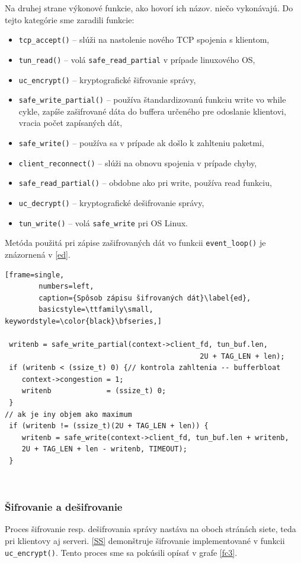  Na druhej strane výkonové funkcie, ako hovorí ich názov. niečo vykonávajú. Do tejto kategórie sme zaradili funkcie:
 \begin{itemize}
 	\item\lstinline|tcp_accept()| -- slúži na nastolenie nového TCP spojenia s klientom, 
 	\item\lstinline|tun_read()| -- volá \lstinline|safe_read_partial| v prípade linuxového OS,
 	\item\lstinline|uc_encrypt()| -- kryptografické šifrovanie správy,
 	\item\lstinline|safe_write_partial()| -- používa štandardizovanú funkciu write vo while cykle, zapíše zašifrované dáta do buffera určeného pre odoslanie klientovi, vracia počet zapísaných dát,
 	\item\lstinline|safe_write()| -- používa sa v prípade ak došlo k zahlteniu paketmi,
 	\item\lstinline|client_reconnect()| -- slúži na obnovu spojenia v prípade chyby,
 	\item\lstinline|safe_read_partial()| -- obdobne ako pri write, používa read funkciu,
 	\item\lstinline|uc_decrypt()| -- kryptografické dešifrovanie správy,
 	\item\lstinline|tun_write()| -- volá \lstinline|safe_write| pri OS Linux.
 \end{itemize}
Metóda použitá pri zápise zašifrovaných dát vo funkcii \lstinline|event_loop()| je znázornená v \ref{ed}.

 \begin{minipage}{\linewidth} 	
 	\begin{lstlisting}[frame=single,
 		numbers=left,
 		caption={Spôsob zápisu šifrovaných dát}\label{ed},
 		basicstyle=\ttfamily\small, keywordstyle=\color{black}\bfseries,]
 		
 writenb = safe_write_partial(context->client_fd, tun_buf.len,
 			    	 		         		  2U + TAG_LEN + len); 
 if (writenb < (ssize_t) 0) {// kontrola zahltenia -- bufferbloat
 	context->congestion = 1; 
 	writenb             = (ssize_t) 0;
 }
// ak je iny objem ako maximum
 if (writenb != (ssize_t)(2U + TAG_LEN + len)) {
 	writenb = safe_write(context->client_fd, tun_buf.len + writenb,
 	2U + TAG_LEN + len - writenb, TIMEOUT); 
 }
   	\end{lstlisting}
\end{minipage}\\ 
 
\subsubsection{Šifrovanie a dešifrovanie}
Proces šifrovanie resp. dešifrovania správy nastáva na oboch stránách siete, teda pri klientovy aj serveri. \ref{SS} demonštruje šifrovanie implementované v funkcii \lstinline|uc_encrypt()|. Tento proces sme sa pokúsili opísať v grafe \ref{fc3}. 


